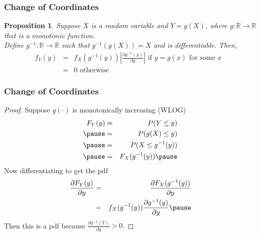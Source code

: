 \documentclass{beamer}
\newtheorem{prop}{Proposition}
\numberwithin{equation}{section}
\begin{document}
\begin{frame}
\frametitle{Change of Coordinates}


\begin{prop}
Suppose $X$ is a random variable and $Y = g(X)$, where $g:\mathbb{R} \rightarrow \mathbb{R}$ that is a $monotonic$ function.  \\
Define $g^{-1}:\mathbb{R} \rightarrow \mathbb{R}$ such that $g^{-1}(g(X)) = X$ and is differentiable.  Then, 
\begin{eqnarray}
f_{Y}(y) & = & f_{X}(g^{-1}(y))\left|\frac{\partial g^{-1}(y)}{\partial y} \right| \text{ if $y = g(x)$ for some $x$ } \nonumber \\
& = & 0 \text{ otherwise } \nonumber 
\end{eqnarray}

\end{prop}


\end{frame}

\begin{frame}
\frametitle{Change of Coordinates}


\begin{proof}

Suppose $g(\cdot)$ is monotonically increasing (WLOG)\pause 
\begin{eqnarray}
F_{Y}(y) & = & P(Y \leq y) \nonumber \\ \pause 
& = & P(g(X) \leq y) \nonumber \\ \pause 
& = & P(X \leq g^{-1}(y) ) \nonumber \\ \pause 
& = & F_{X}(g^{-1}(y) ) \nonumber  \pause 
\end{eqnarray}
Now differentiating to get the pdf  \pause 
\begin{eqnarray}
\frac{\partial F_{Y}(y)}{\partial y} & = & \frac{\partial F_{X}(g^{-1}(y) )} {\partial y } \nonumber \\
 & = & f_{X}(g^{-1}(y) ) \frac{\partial g^{-1}(y)}{\partial y }   \nonumber  \pause 
\end{eqnarray}
Then this is a pdf because $\frac{\partial g^{-1}(Y)}{\partial y } > 0$.   


\end{proof}



\end{frame}
\end{document}

